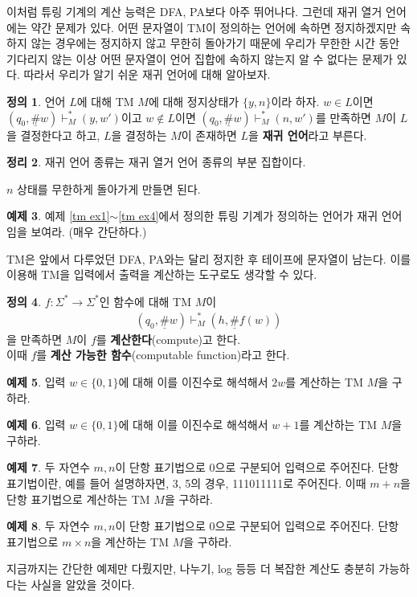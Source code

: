 \documentclass[b5paper, 11pt]{book}
\theoremstyle{definition}
\newtheorem{defn}{정의}[chapter]
\newtheorem{thm}[defn]{정리}
\newtheorem{ex}[defn]{예제}
\newenvironment{pf*}{\pushQED{\qed}\pf}
{\popQED\endpf}
\begin{document}
이처럼 튜링 기계의 계산 능력은 DFA, PA보다 아주 뛰어나다. 그런데 재귀 열거 언어에는 약간 문제가 있다. 어떤 문자열이 TM이 정의하는 언어에 속하면 정지하겠지만 속하지 않는 경우에는 정지하지 않고 무한히 돌아가기 때문에 우리가 무한한 시간 동안 기다리지 않는 이상 어떤 문자열이 언어 집합에 속하지 않는지 알 수 없다는 문제가 있다. 따라서 우리가 알기 쉬운 재귀 언어에 대해 알아보자.
\begin{defn}
    언어 $L$에 대해 TM $M$에 대해 정지상태가 $\{y,n\}$이라 하자. $w \in L$이면 $(q_0, \underline{\#}w) \vdash_M^* (y, w')$이고 $w \notin L$이면 $(q_0, \underline{\#}w) \vdash_M^* (n, w')$를 만족하면 $M$이 $L$을 결정한다고 하고, $L$을 결정하는 $M$이 존재하면 $L$을 \textbf{재귀 언어}라고 부른다.
\end{defn}
\begin{thm}
    재귀 언어 종류는 재귀 열거 언어 종류의 부분 집합이다.
\end{thm}
\begin{pf*}
    $n$ 상태를 무한하게 돌아가게 만들면 된다.
\end{pf*}
\begin{ex}
    예제 \ref{tm ex1}$\sim$\ref{tm ex4}에서 정의한 튜링 기계가 정의하는 언어가 재귀 언어임을 보여라. (매우 간단하다.)
\end{ex}
TM은 앞에서 다루었던 DFA, PA와는 달리 정지한 후 테이프에 문자열이 남는다. 이를 이용해 TM을 입력에서 출력을 계산하는 도구로도 생각할 수 있다.
\begin{defn}
    $f: \Sigma^* \rightarrow \Sigma^*$인 함수에 대해 TM $M$이
    \begin{align*}
        (q_0, \underline{\#}w) \vdash_M^* (h, \underline{\#}f(w))
    \end{align*}
    을 만족하면 $M$이 $f$를 \textbf{계산한다}(compute)고 한다. \\ 
    이때 $f$를 \textbf{계산 가능한 함수}(computable function)라고 한다. 
\end{defn}
\begin{ex}
    입력 $w \in \{0,1\}$에 대해 이를 이진수로 해석해서 $2w$를 계산하는 TM $M$을 구하라. 
\end{ex}
\begin{ex}
    입력 $w \in \{0,1\}$에 대해 이를 이진수로 해석해서 $w + 1$를 계산하는 TM $M$을 구하라. 
\end{ex}
\begin{ex}
    두 자연수 $m, n$이 단항 표기법으로 0으로 구분되어 입력으로 주어진다. 단항 표기법이란, 예를 들어 설명하자면, 3, 5의 경우, 111011111로 주어진다. 이때 $m+n$을 단항 표기법으로 계산하는 TM $M$을 구하라. 
\end{ex}
\begin{ex}
    두 자연수 $m,n$이 단항 표기법으로 0으로 구분되어 입력으로 주어진다. 단항 표기법으로 $m \times n$을 계산하는 TM $M$을 구하라. 
\end{ex}
지금까지는 간단한 예제만 다뤘지만, 나누기, log 등등 더 복잡한 계산도 충분히 가능하다는 사실을 알았을 것이다.
\end{document}
